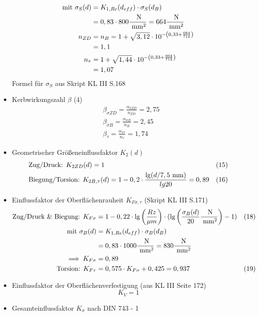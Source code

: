 \begin{itemize}
\begin{align*}
		\text{mit } \sigma_S (d) &= K_{1,Re} (d_{eff}) \cdot \sigma_S (d_B) \\
		&= 0,83 \cdot 800 \frac{\text{ N}}{\text{ mm}^2} = 664 \frac{\text{ N}}{\text{ mm}^2} \\
		n_{ZD} &= n_B = 1 + \sqrt{3,12} \cdot 10 ^{-\left( 0,33 + \frac{664}{712} \right)} \\
		&=1,1 \\
		n_{\tau} &= 1 + \sqrt{1,44} \cdot 10 ^{-\left( 0,33 + \frac{664}{712} \right)} \\
		&= 1,07 
	\end{align*}
	Formel für $\sigma_S$ aus Skript KL III  S.168
	\item Kerbwirkungszahl $\beta$ \hfill (4)
	\begin{align*}
		&\beta_{\sigma ZD} = \frac{\alpha_{\sigma ZD}}{n_{ZD}} = 2,75 \\
		&\beta_{\sigma B} = \frac{\alpha_{\sigma B}}{n_{B}} = 2,45 \\
		&\beta_{ \tau} = \frac{\alpha_{\sigma \tau}}{n_{\tau}} = 1,74 
	\end{align*}
	\item Geometrischer Größeneinflussfaktor $K_2 (d)$ 
	\begin{align*}
		&\text{Zug/Druck: }K_{2ZD} (d) = 1 & (15) \\
		&\text{Biegung/Torsion: } K_{2B,\tau} (d) = 1 -0,2 \cdot  \frac{\lg (d / 7,5 \text{ mm})}{lg 20}  = 0,89 &(16) 
	\end{align*}
	\item Einflussfaktor der Oberflächenrauheit $K_{F\sigma, \tau}$ (Skript KL III  S.171)
	\begin{align*}
		\text{Zug/Druck \& Biegung: } K_{F\sigma} &= 1 - 0,22 \cdot \lg \left( \frac{Rz}{\mu m}\right) \cdot ( \lg \left( \frac{\sigma_B (d)}{20}\frac{\text{ N}}{\text{ mm}^2}\right) -1 ) &(18) \\
		\text{mit } \sigma_B (d) &= K_{1,Re} (d_{eff}) \cdot \sigma_B (d_B) \\
		&= 0,83 \cdot 1000\frac{\text{ N}}{\text{ mm}^2} = 830 \frac{\text{ N}}{\text{ mm}^2} \\
		\implies K_{F\sigma} &= 0,89 \\
		\text{Torsion: } K_{F\tau} &= 0,575 \cdot K_{F\sigma} +0,425 = 0,937 & (19) 
	\end{align*}
	\item Einflussfaktor der Oberflächenverfestigung (aus KL III  Seite 172)
	\[
		K_{V} = 1
	\]
	\item Gesamteinflussfaktor $K_{\sigma}$ nach DIN 743 - 1

\end{itemize}
